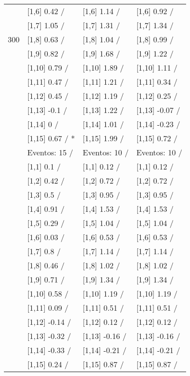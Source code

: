 \begin{table}
\begin{tabular}[t]{llll}
 & {}[1,6] 0.42  / & {}[1,6] 1.14  / & {}[1,6] 0.92  /\\
 & {}[1,7] 1.05  / & {}[1,7] 1.31  / & {}[1,7] 1.34  /\\
300 & {}[1,8] 0.63  / & {}[1,8] 1.04  / & {}[1,8] 0.99  /\\
\addlinespace
 & {}[1,9] 0.82  / & {}[1,9] 1.68  / & {}[1,9] 1.22  /\\
 & {}[1,10] 0.79  / & {}[1,10] 1.89  / & {}[1,10] 1.11  /\\
 & {}[1,11] 0.47  / & {}[1,11] 1.21  / & {}[1,11] 0.34  /\\
 & {}[1,12] 0.45  / & {}[1,12] 1.19  / & {}[1,12] 0.25  /\\
 & {}[1,13] -0.1  / & {}[1,13] 1.22  / & {}[1,13] -0.07  /\\
\addlinespace
 & {}[1,14] 0  / & {}[1,14] 1.01  / & {}[1,14] -0.23  /\\
 & {}[1,15] 0.67  / * & {}[1,15] 1.99  / & {}[1,15] 0.72  /\\
 & Eventos:  15 / & Eventos:  10 / & Eventos:  10 /\\
 & {}[1,1] 0.1  / & {}[1,1] 0.12  / & {}[1,1] 0.12  /\\
 & {}[1,2] 0.42  / & {}[1,2] 0.72  / & {}[1,2] 0.72  /\\
\addlinespace
 & {}[1,3] 0.5  / & {}[1,3] 0.95  / & {}[1,3] 0.95  /\\
 & {}[1,4] 0.91  / & {}[1,4] 1.53  / & {}[1,4] 1.53  /\\
 & {}[1,5] 0.29  / & {}[1,5] 1.04  / & {}[1,5] 1.04  /\\
 & {}[1,6] 0.03  / & {}[1,6] 0.53  / & {}[1,6] 0.53  /\\
 & {}[1,7] 0.8  / & {}[1,7] 1.14  / & {}[1,7] 1.14  /\\
\addlinespace
500 & {}[1,8] 0.46  / & {}[1,8] 1.02  / & {}[1,8] 1.02  /\\
 & {}[1,9] 0.71  / & {}[1,9] 1.34  / & {}[1,9] 1.34  /\\
 & {}[1,10] 0.58  / & {}[1,10] 1.19  / & {}[1,10] 1.19  /\\
 & {}[1,11] 0.09  / & {}[1,11] 0.51  / & {}[1,11] 0.51  /\\
 & {}[1,12] -0.14  / & {}[1,12] 0.12  / & {}[1,12] 0.12  /\\
\addlinespace
 & {}[1,13] -0.32  / & {}[1,13] -0.16  / & {}[1,13] -0.16  /\\
 & {}[1,14] -0.33  / & {}[1,14] -0.21  / & {}[1,14] -0.21  /\\
 & {}[1,15] 0.24  / & {}[1,15] 0.87  / & {}[1,15] 0.87  /\\
\bottomrule
\end{tabular}
\end{table}
